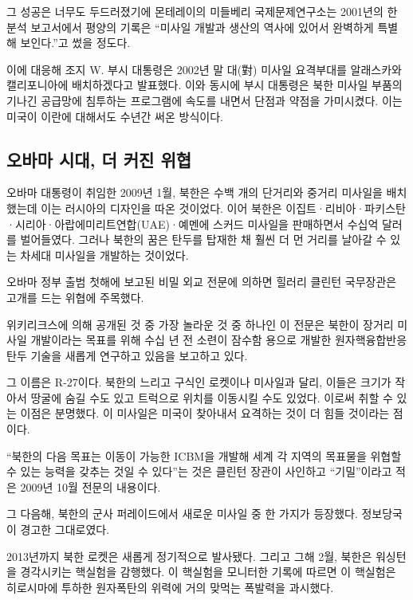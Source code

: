 그 성공은 너무도 두드러졌기에 몬테레이의 미들베리 국제문제연구소는
2001년의 한 분석 보고서에서 평양의 기록은 ``미사일 개발과 생산의 역사에
있어서 완벽하게 특별해 보인다.''고 썼을 정도다.

이에 대응해 조지 W. 부시 대통령은 2002년 말 대(對) 미사일 요격부대를
알래스카와 캘리포니아에 배치하겠다고 발표했다. 이와 동시에 부시 대통령은
북한 미사일 부품의 기나긴 공급망에 침투하는 프로그램에 속도를 내면서
단점과 약점을 가미시켰다. 이는 미국이 이란에 대해서도 수년간 써온
방식이다.

\hypertarget{uxc624uxbc14uxb9c8-uxc2dcuxb300-uxb354-uxcee4uxc9c4-uxc704uxd611}{%
\subsection{오바마 시대, 더 커진
위협}\label{uxc624uxbc14uxb9c8-uxc2dcuxb300-uxb354-uxcee4uxc9c4-uxc704uxd611}}

오바마 대통령이 취임한 2009년 1월, 북한은 수백 개의 단거리와 중거리
미사일을 배치했는데 이는 러시아의 디자인을 따온 것이었다. 이어 북한은
이집트·리비아·파키스탄·시리아·아랍에미리트연합(UAE)·예멘에 스커드
미사일을 판매하면서 수십억 달러를 벌어들였다. 그러나 북한의 꿈은 탄두를
탑재한 채 훨씬 더 먼 거리를 날아갈 수 있는 차세대 미사일을 개발하는
것이었다.

오바마 정부 출범 첫해에 보고된 비밀 외교 전문에 의하면 힐러리 클린턴
국무장관은 고개를 드는 위협에 주목했다.

위키리크스에 의해 공개된 것 중 가장 놀라운 것 중 하나인 이 전문은 북한이
장거리 미사일 개발이라는 목표를 위해 수십 년 전 소련이 잠수함 용으로
개발한 원자핵융합반응 탄두 기술을 새롭게 연구하고 있음을 보고하고 있다.

그 이름은 R-27이다. 북한의 느리고 구식인 로켓이나 미사일과 달리, 이들은
크기가 작아서 땅굴에 숨길 수도 있고 트럭으로 위치를 이동시킬 수도
있었다. 이로써 취할 수 있는 이점은 분명했다. 이 미사일은 미국이 찾아내서
요격하는 것이 더 힘들 것이라는 점이다.

``북한의 다음 목표는 이동이 가능한 ICBM을 개발해 세계 각 지역의 목표물을
위협할 수 있는 능력을 갖추는 것일 수 있다''는 것은 클린턴 장관이
사인하고 ``기밀''이라고 적은 2009년 10월 전문의 내용이다.

그 다음해, 북한의 군사 퍼레이드에서 새로운 미사일 중 한 가지가 등장했다.
정보당국이 경고한 그대로였다.

2013년까지 북한 로켓은 새롭게 정기적으로 발사됐다. 그리고 그해 2월,
북한은 워싱턴을 경각시키는 핵실험을 감행했다. 이 핵실험을 모니터한
기록에 따르면 이 핵실험은 히로시마에 투하한 원자폭탄의 위력에 거의
맞먹는 폭발력을 과시했다.

